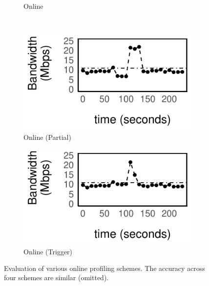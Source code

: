 \begin{figure}
\begin{subfigure}[t]{0.48\columnwidth}
    \caption{Online}
    \label{fig:online}
  \end{subfigure}
  \\
  \vspace{1.5em}
  \begin{subfigure}[t]{0.48\columnwidth}
    \includegraphics[width=\textwidth]{figures/online3.pdf}
    \caption{Online (Partial)}
    \label{fig:online-partial}
  \end{subfigure}
  \hfill
  \begin{subfigure}[t]{0.48\columnwidth}
    \includegraphics[width=\textwidth]{figures/online4.pdf}
    \caption{Online (Trigger)}
    \label{fig:online-trigger}
  \end{subfigure}
  \caption{Evaluation of various online profiling schemes. The accuracy across
    four schemes are similar (omitted).}
  \label{fig:online-tricks}
\end{figure}

